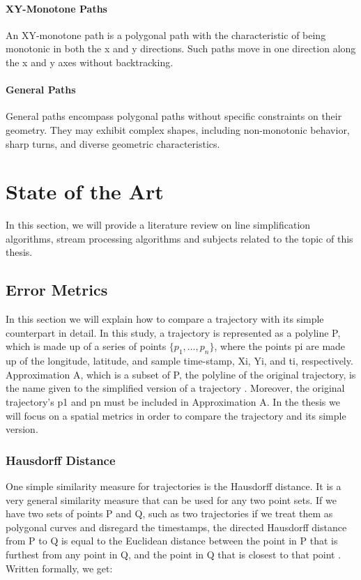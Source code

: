 \documentclass[twoside,12pt, a4paper]{report}
\begin{document}
\subsubsection{XY-Monotone Paths} 

An XY-monotone path is a polygonal path with the characteristic of being monotonic in both the x and y directions. Such paths move in one direction along the x and y axes without backtracking.

\subsubsection{General Paths} 

General paths encompass polygonal paths without specific constraints on their geometry. They may exhibit complex shapes, including non-monotonic behavior, sharp turns, and diverse geometric characteristics.

\fi

\chapter{State of the Art}
In this section, we will provide a literature review on line simplification algorithms, stream processing algorithms and subjects related to the topic of this thesis.

\section{Error Metrics}

In this section we will explain how to compare a trajectory with its simple counterpart in detail. In this study, a trajectory is represented as a polyline P, which is made up of a series of points  $\{p_{1},..., p_{n}\}$, where the points pi are made up of the longitude, latitude, and sample time-stamp, Xi, Yi, and ti, respectively. Approximation A, which is a subset of P, the polyline of the original trajectory, is the name given to the simplified version of a trajectory \cite{van2017extensive}. Moreover, the original trajectory's p1 and pn must be included in Approximation A. 
In the thesis we will focus on a spatial metrics in order to compare the trajectory and its simple version.  

\subsection{Hausdorff Distance}

  
One simple similarity measure for trajectories is the Hausdorff distance. It is a very
general similarity measure that can be used for any two point sets. If we have two
sets of points P and Q, such as two trajectories if we treat them as polygonal curves
and disregard the timestamps, the directed Hausdorff distance from P to Q is equal
to the Euclidean distance between the point in P that is furthest from any point in
Q, and the point in Q that is closest to that point \cite{kerkhof2022algorithmic}. Written formally, we get:
\end{document}
